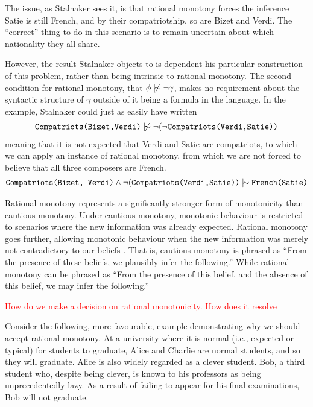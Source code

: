 The issue, as Stalnaker sees it, is that rational monotony forces the inference Satie is still French, and by their
compatriotship, so are Bizet and Verdi. The ``correct'' thing to do in this scenario is to remain uncertain about which
nationality they all share.

However, the result Stalnaker objects to is dependent his particular construction of this problem, rather than being
intrinsic to rational monotony. The second condition for rational monotony, that $\phi \ntwiddle \neg \gamma$, makes no requirement
about the syntactic structure of $\gamma$ outside of it being a formula in the language. In the example, Stalnaker could
just as easily have written
\begin{align}
	\texttt{Compatriots(Bizet,Verdi)}\ntwiddle \neg (\neg \texttt{Compatriots(Verdi,Satie))}
\end{align}
meaning that it is not expected that Verdi and Satie are compatriots, to which we can apply an instance of rational
monotony, from which we are not forced to believe that all three composers are French.
\begin{align}
	\texttt{Compatriots(Bizet, Verdi)}\land \neg(\texttt{Compatriots(Verdi,Satie))}\twiddle \texttt{French(Satie)}
\end{align}

Rational monotony represents a significantly stronger form of monotonicity than cautious monotony. Under cautious
monotony, monotonic behaviour is restricted to scenarios where the new information was already expected. Rational
monotony goes further, allowing monotonic behaviour when the new information was merely not contradictory to our beliefs
\cite{sep-logic-nonmonotonic-Stanford}. That is, cautious monotony is phrased as ``From the presence of these beliefs,
we plausibly infer the following.'' While rational monotony can be phrased as ``From the presence of this belief, and
the absence of this belief, we may infer the following.''

\textcolor{red}{How do we make a decision on rational monotonicity. How does it resolve}

Consider the following, more favourable, example demonstrating why we should accept rational monotony. At a university
where it is normal (i.e., expected or typical) for students to graduate, Alice and Charlie are normal students, and so
they will graduate. Alice is also widely regarded as a clever student. Bob, a third student who, despite being clever, is
known to his professors as being unprecedentedly lazy. As a result of failing to appear for his final examinations, Bob will
not graduate.

